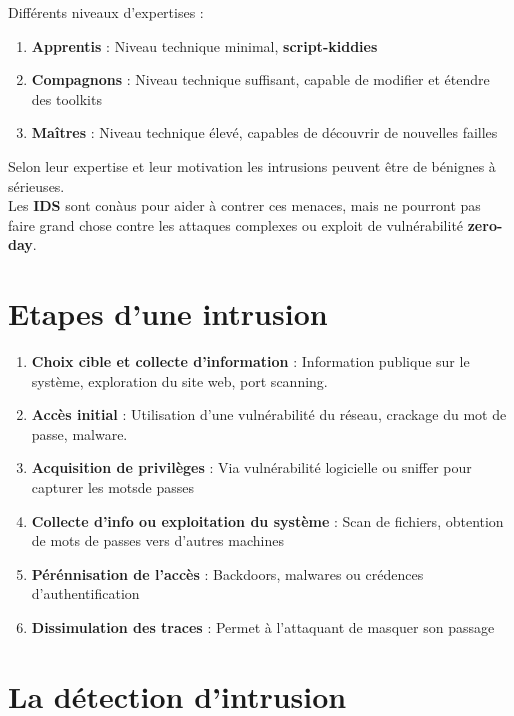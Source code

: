 \documentclass{report}
\begin{document}
		Différents niveaux d'expertises : \\
		\begin{enumerate}
			\item \textbf{Apprentis} : Niveau technique minimal, \textbf{script-kiddies}
			\item \textbf{Compagnons} : Niveau technique suffisant, capable de modifier et étendre des toolkits
			\item \textbf{Maîtres} : Niveau technique élevé, capables de découvrir de nouvelles failles
		\end{enumerate}

		Selon leur expertise et leur motivation les intrusions peuvent être de bénignes à sérieuses.\\

		Les \textbf{IDS} sont conàus pour aider à contrer ces menaces, mais ne pourront pas faire grand chose contre les attaques complexes ou exploit de vulnérabilité \textbf{zero-day}.\\

	\section{Etapes d'une intrusion}

		\begin{enumerate}
			\item \textbf{Choix cible et collecte d'information} : Information publique sur le système, exploration du site web, port scanning.
			\item \textbf{Accès initial} : Utilisation d'une vulnérabilité du réseau, crackage du mot de passe, malware.
			\item \textbf{Acquisition de privilèges} : Via vulnérabilité logicielle ou sniffer pour capturer les motsde passes
			\item \textbf{Collecte d'info ou exploitation du système} : Scan de fichiers, obtention de mots de passes vers d'autres machines
			\item \textbf{Pérénnisation de l'accès} : Backdoors, malwares ou crédences d'authentification
			\item \textbf{Dissimulation des traces} : Permet à l'attaquant de masquer son passage\\
		\end{enumerate}

	\section{La détection d'intrusion}
\end{document}
